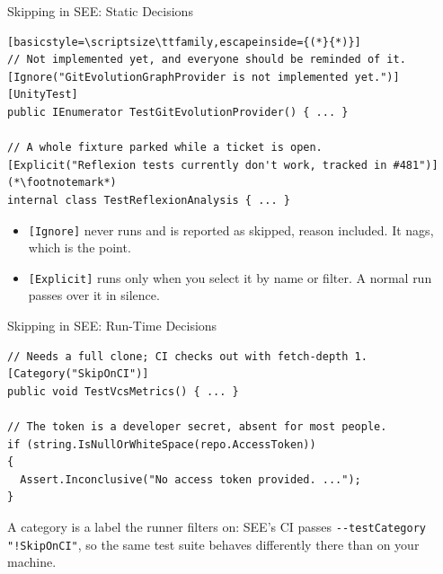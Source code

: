 \begin{frame}[fragile]{Skipping in SEE: Static Decisions}
  \begin{lstlisting}[basicstyle=\scriptsize\ttfamily,escapeinside={(*}{*)}]
// Not implemented yet, and everyone should be reminded of it.
[Ignore("GitEvolutionGraphProvider is not implemented yet.")]
[UnityTest]
public IEnumerator TestGitEvolutionProvider() { ... }

// A whole fixture parked while a ticket is open.
[Explicit("Reflexion tests currently don't work, tracked in #481")](*\footnotemark*)
internal class TestReflexionAnalysis { ... }
  \end{lstlisting}
  \vspace{-0.5ex}

  \begin{itemize}
    \item \texttt{[Ignore]} never runs and is reported as skipped, reason
      included. It nags, which is the point.
    \item \texttt{[Explicit]} runs only when you select it by name or filter.
      A normal run passes over it in silence.
  \end{itemize}
  \vspace{0.5ex}

\end{frame}

\begin{frame}[fragile]{Skipping in SEE: Run-Time Decisions}
  \begin{lstlisting}[basicstyle=\scriptsize\ttfamily]
// Needs a full clone; CI checks out with fetch-depth 1.
[Category("SkipOnCI")]
public void TestVcsMetrics() { ... }

// The token is a developer secret, absent for most people.
if (string.IsNullOrWhiteSpace(repo.AccessToken))
{
  Assert.Inconclusive("No access token provided. ...");
}
  \end{lstlisting}
  \vspace{1ex}

  A category is a label the runner filters on: SEE's CI passes
  \texttt{-{}-testCategory "!SkipOnCI"}, so the same test suite behaves
  differently there than on your machine.
  \vspace{1ex}

\end{frame}

